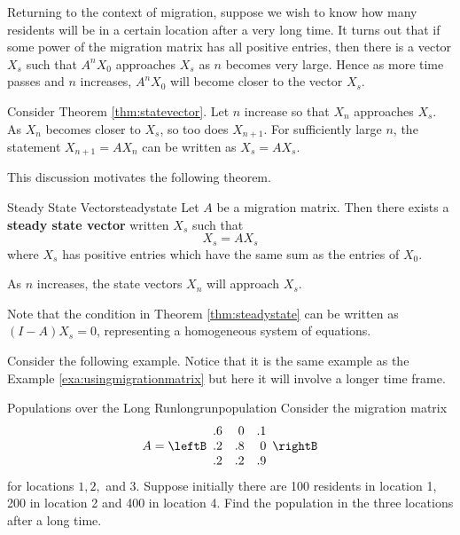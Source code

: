 Returning to the context of migration, suppose we wish to know how many residents will be in a certain location
after a very long time. It turns out that if some power of the
migration matrix has all positive entries, then there is a vector $X_s$ such that $A^{n}X_{0}$ approaches $X_s$ as $n$ becomes very large. Hence as more time passes and $n$ increases, $A^{n}X_{0}$ will become closer to the vector $X_s$. 

Consider Theorem \ref{thm:statevector}. Let $n$ increase so that $X_n$ approaches $X_s$. As $X_n$ becomes closer to $X_s$, so too does $X_{n+1}$. For sufficiently large $n$, the statement $X_{n+1} = AX_n$ can be written as $X_s = AX_s$. 

This discussion motivates the following theorem.

\begin{theorem}{Steady State Vector}{steadystate}
Let $A$ be a migration matrix. Then there exists a \textbf{steady state vector} written $X_s$ such that 
\[
X_s = AX_s
\]
where $X_s$ has positive entries which have the same sum as the entries of $X_0$. 

As $n$ increases, the state vectors $X_n$ will approach $X_s$. 
\end{theorem}

Note that the condition in Theorem \ref{thm:steadystate} can be written as $(I - A)X_s=0$, representing a homogeneous system of equations. 

Consider the following example. Notice that it is the same example as the Example \ref{exa:usingmigrationmatrix} but here it will
involve a longer time frame.

\begin{example}{Populations over the Long Run}{longrunpopulation}
Consider the migration matrix 
\begin{equation*}
A
=
\leftB
\begin{array}{rrr}
.6 & 0 & .1 \\
.2 & .8 & 0 \\
.2 & .2 & .9
\end{array}
\rightB 
\end{equation*}
 for locations $1,2,$ and $3.$ Suppose initially there are 100
residents in location 1, 200 in location 2 and 400 in location 4. Find the
population in the three locations after a long time.
\end{example}

